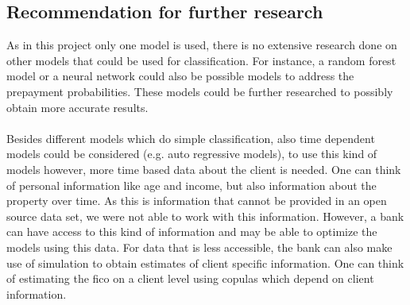 \subsection{Recommendation for further research}
    As in this project only one model is used, there is no 
    extensive research done on other models that could be 
    used for classification. For instance, a random forest 
    model or a neural network could also be possible models 
    to address the prepayment probabilities. These models 
    could be further researched to possibly obtain more accurate 
    results. 
    \\\\
    Besides different models which do simple classification, 
    also time dependent models could be considered (e.g.
    auto regressive models), to use this kind of models 
    however, more time based data about the client is 
    needed. One can think of personal information like age
    and income, but also information about the property over 
    time. As this is information that cannot be provided in 
    an open source data set, we were not able to work with 
    this information. However, a bank can have access to 
    this kind of information and may be able to optimize
    the models using this data.
    For data that is less accessible, the bank can also 
    make use of simulation to obtain estimates of client 
    specific information. One can think of estimating the 
    fico on a client level using copulas which depend
    on client information. 